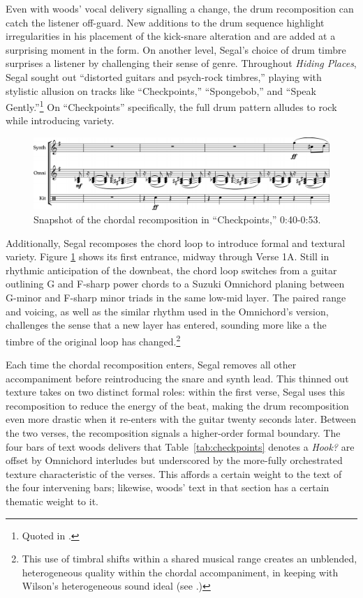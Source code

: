 Even with woods' vocal delivery signalling a change, the drum recomposition can catch the listener
off-guard. New additions to the drum sequence highlight irregularities in his placement of the 
kick-snare alteration and are added at a surprising moment in the form. On another level, Segal's
choice of drum timbre surprises a listener by challenging their sense of genre. Throughout 
\textit{Hiding Places}, Segal sought out ``distorted guitars and psych-rock timbres,'' playing with
stylistic allusion on  tracks like ``Checkpoints,'' ``Spongebob,'' and ``Speak Gently.''\footnote{
    Quoted in \cite{backwoodzhiphopKennySegalPresents2019}.} 
On ``Checkpoints'' specifically, the full drum pattern alludes to rock while introducing variety.

    \begin{figure}[ht]
        \centering
        \includegraphics[width=\textwidth]{images/figures/chp 02/040053checkpointsrecomp.pdf}
        \caption{Snapshot of the chordal recomposition in ``Checkpoints,'' 0:40-0:53.}
        \label{fig:checkpointsrecomp}
    \end{figure}

Additionally, Segal recomposes the chord loop to introduce formal and textural variety. Figure
\ref{fig:checkpointsrecomp} shows its first entrance, midway through Verse 1A. Still in rhythmic 
anticipation of the downbeat, the chord loop switches from a guitar outlining G and F-sharp power
chords to a Suzuki Omnichord planing between G-minor and F-sharp minor triads in the same low-mid
layer. The paired range and voicing, as well as the similar rhythm used in the Omnichord's version,
challenges the sense that a new layer has entered, sounding more like a the timbre of the original
loop has changed.\footnote{
    This use of timbral shifts within a shared musical range creates an unblended, heterogeneous 
    quality within the chordal accompaniment, in keeping with Wilson's heterogeneous 
    sound ideal (see \autocite[329]{ollywilsonHeterogeneousSoundIdeal1992}.)}

Each time the chordal recomposition enters, Segal removes all other accompaniment before reintroducing
the snare and synth lead. This thinned out texture takes on two distinct formal roles: within the first
verse, Segal uses this recomposition to reduce the energy of the beat, making the drum recomposition
even more drastic when it re-enters with the guitar twenty seconds later. Between the two verses,
the recomposition signals a higher-order formal boundary. The four bars of text woods delivers that
Table~\ref{tab:checkpoints} denotes a \textit{Hook?} are offset by Omnichord interludes but underscored
by the more-fully orchestrated texture characteristic of the verses. This affords a certain weight to
the text of the four intervening bars; likewise, woods' text in that section has a certain thematic
weight to it.


